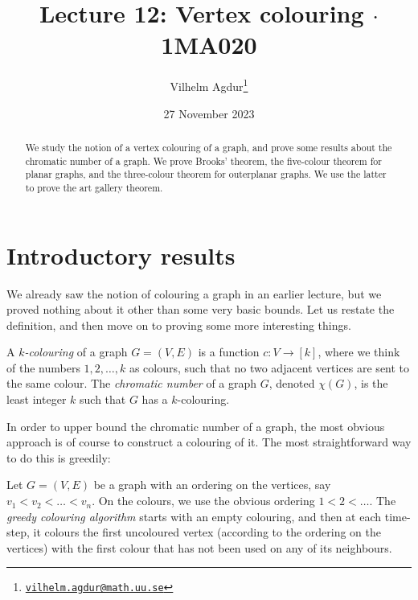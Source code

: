 \documentclass[nobib]{tufte-handout}
\title{Lecture 12: Vertex colouring $\cdot$ 1MA020}
\author[Vilhelm Agdur]{Vilhelm Agdur\thanks{\href{mailto:vilhelm.agdur@math.uu.se}{\nolinkurl{vilhelm.agdur@math.uu.se}}}}
\date{27 November 2023}
\begin{document}
\maketitle%

\begin{abstract}
\noindent
We study the notion of a vertex colouring of a graph, and prove some results about the chromatic number of a graph. We prove Brooks' theorem, the five-colour theorem for planar graphs, and the three-colour theorem for outerplanar graphs. We use the latter to prove the art gallery theorem.
\end{abstract}

\section{Introductory results}

We already saw the notion of colouring a graph in an earlier lecture, but we proved nothing about it other than some very basic bounds. Let us restate the definition, and then move on to proving some more interesting things.

\begin{definition}
  A \emph{$k$-colouring} of a graph $G = (V,E)$ is a function $c: V \to [k]$, where we think of the numbers $1,2,\ldots,k$ as colours, such that no two adjacent vertices are sent to the same colour. The \emph{chromatic number} of a graph $G$, denoted $\chi(G)$, is the least integer $k$ such that $G$ has a $k$-colouring.
\end{definition}

In order to upper bound the chromatic number of a graph, the most obvious approach is of course to construct a colouring of it. The most straightforward way to do this is greedily:

\begin{definition}
  Let $G = (V,E)$ be a graph with an ordering on the vertices, say $v_1 < v_2 <\ldots<v_n$. On the colours, we use the obvious ordering $1 < 2 < \ldots$. The \emph{greedy colouring algorithm} starts with an empty colouring, and then at each time-step, it colours the first uncoloured vertex (according to the ordering on the vertices) with the first colour that has not been used on any of its neighbours.
\end{definition}
\end{document}

